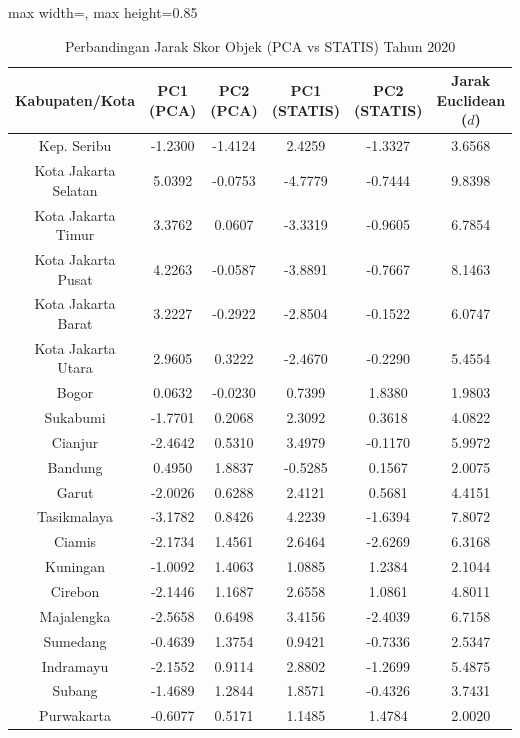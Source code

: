 \begin{table}[H]
\centering
\caption{Perbandingan Jarak Skor Objek (PCA vs STATIS) Tahun 2020} \makeatletter{}\makeatother
\begin{adjustbox}{max width=\textwidth, max height=0.85\textheight}
\begin{tabular}{|c|c|c|c|c|c|}
\hline
\textbf{Kabupaten/Kota} & \textbf{PC1 (PCA)} & \textbf{PC2 (PCA)} & \textbf{PC1 (STATIS)} & \textbf{PC2 (STATIS)} & \textbf{Jarak Euclidean ($d$)} \\
\hline
Kep. Seribu & -1.2300 & -1.4124 & 2.4259 & -1.3327 & 3.6568 \\
Kota Jakarta Selatan & 5.0392 & -0.0753 & -4.7779 & -0.7444 & 9.8398 \\
Kota Jakarta Timur & 3.3762 & 0.0607 & -3.3319 & -0.9605 & 6.7854 \\
Kota Jakarta Pusat & 4.2263 & -0.0587 & -3.8891 & -0.7667 & 8.1463 \\
Kota Jakarta Barat & 3.2227 & -0.2922 & -2.8504 & -0.1522 & 6.0747 \\
Kota Jakarta Utara & 2.9605 & 0.3222 & -2.4670 & -0.2290 & 5.4554 \\
Bogor & 0.0632 & -0.0230 & 0.7399 & 1.8380 & 1.9803 \\
Sukabumi & -1.7701 & 0.2068 & 2.3092 & 0.3618 & 4.0822 \\
Cianjur & -2.4642 & 0.5310 & 3.4979 & -0.1170 & 5.9972 \\
Bandung & 0.4950 & 1.8837 & -0.5285 & 0.1567 & 2.0075 \\
Garut & -2.0026 & 0.6288 & 2.4121 & 0.5681 & 4.4151 \\
Tasikmalaya & -3.1782 & 0.8426 & 4.2239 & -1.6394 & 7.8072 \\
Ciamis & -2.1734 & 1.4561 & 2.6464 & -2.6269 & 6.3168 \\
Kuningan & -1.0092 & 1.4063 & 1.0885 & 1.2384 & 2.1044 \\
Cirebon & -2.1446 & 1.1687 & 2.6558 & 1.0861 & 4.8011 \\
Majalengka & -2.5658 & 0.6498 & 3.4156 & -2.4039 & 6.7158 \\
Sumedang & -0.4639 & 1.3754 & 0.9421 & -0.7336 & 2.5347 \\
Indramayu & -2.1552 & 0.9114 & 2.8802 & -1.2699 & 5.4875 \\
Subang & -1.4689 & 1.2844 & 1.8571 & -0.4326 & 3.7431 \\
Purwakarta & -0.6077 & 0.5171 & 1.1485 & 1.4784 & 2.0020 \\

\end{tabular}
\end{adjustbox}
\end{table}
